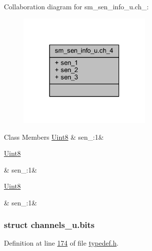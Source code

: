 Collaboration diagram for sm\+\_\+sen\+\_\+info\+\_\+u.\+ch\+\_\+:
\nopagebreak
\begin{figure}[H]
\begin{center}
\leavevmode
\includegraphics[width=186pt]{d4/d04/a00255}
\end{center}
\end{figure}
\begin{DoxyFields}{Class Members}
\hypertarget{a00001_a226219dc5b8b7d5e5d1e7cf59aff4981}{\hyperlink{a00001_a979e3e23b9a449e69ab6a8a83b6042f8}{Uint8}}\label{a00001_a226219dc5b8b7d5e5d1e7cf59aff4981}
&
sen\+\_\+:1&
\\
\hline

\hypertarget{a00001_a7111d63086b336f186d5c29829ed8852}{\hyperlink{a00001_a979e3e23b9a449e69ab6a8a83b6042f8}{Uint8}}\label{a00001_a7111d63086b336f186d5c29829ed8852}
&
sen\+\_\+:1&
\\
\hline

\hypertarget{a00001_a25b93705f9c83a019eb4874d5e07cafd}{\hyperlink{a00001_a979e3e23b9a449e69ab6a8a83b6042f8}{Uint8}}\label{a00001_a25b93705f9c83a019eb4874d5e07cafd}
&
sen\+\_\+:1&
\\
\hline

\end{DoxyFields}
\label{d4/de8/a00061}
\hypertarget{a00001_d4/de8/a00061}{}
\subsubsection{struct channels\+\_\+u.\+bits}


Definition at line \hyperlink{a00001_source_l00174}{174} of file \hyperlink{a00001_source}{typedef.\+h}.



